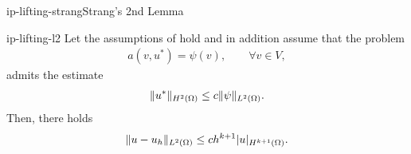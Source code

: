 \begin{Lemma*}{ip-lifting-strang}{Strang's 2nd Lemma}
\begin{Theorem}{ip-lifting-l2}
  Let the assumptions of  hold and in
  addition assume that the problem
  \begin{gather*}
    a(v,u^*) = \psi(v),\qquad\forall v\in V,
  \end{gather*}
  admits the  estimate
  \begin{gather}
    \label{eq:ip-lifting:12}
    \lVert u^*\rVert_{H^2(\Omega)} \le c \lVert\psi\rVert_{L^2(\Omega)}.
  \end{gather}
  Then, there holds
  \begin{gather}
    \label{eq:ip-lifting:13}
    \lVert u-u_h\rVert_{L^2(\Omega)} \le c h^{k+1} \lvert u\rvert_{H^{k+1}(\Omega)}.
  \end{gather}
\end{Theorem}


\end{Lemma*}
